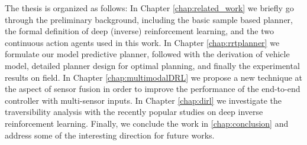 \documentclass[../thesis.tex]{subfiles}
\begin{document}
The thesis is organized as follows:
In Chapter \ref{chap:related_work} we briefly go through the preliminary background, including the basic sample based planner, the formal definition of deep (inverse) reinforcement learning, and the two continuous action agents used in this work.
In Chapter \ref{chap:rrtplanner} we formulate our model predictive planner, followed with the derivation of vehicle model, detailed planner design for optimal planning, and finally the experimental results on field.
In Chapter \ref{chap:multimodalDRL} we propose a new technique at the aspect of sensor fusion in order to improve the performance of the end-to-end controller with multi-sensor inputs. 
In Chapter \ref{chap:dirl} we investigate the traversibility analysis with the recently popular studies on deep inverse reinforcement learning.
Finally, we conclude the work in \ref{chap:conclusion} and address some of the interesting direction for future works.
\end{document}
